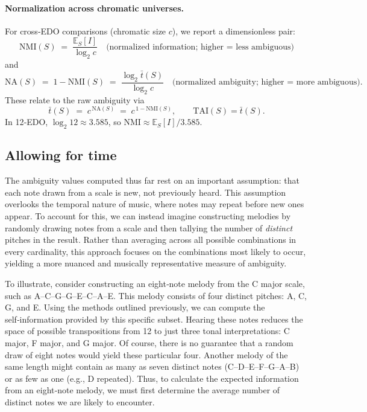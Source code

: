 \documentclass[10pt,twocolumn]{article}
\numberwithin{equation}{section} %
\begin{document}
    

    \paragraph{Normalization across chromatic universes.}
    For cross‑EDO comparisons (chromatic size $c$), we report a dimensionless pair:
    \[
        \mathrm{NMI}(S) \;=\; \frac{\mathbb{E}_S[I]}{\log_2 c} \quad \text{(normalized information; higher = less ambiguous)}
    \]
    and
    \[
        \mathrm{NA}(S) \;=\; 1 - \mathrm{NMI}(S) \;=\; \frac{\log_2 \bar{t}(S)}{\log_2 c} \quad \text{(normalized ambiguity; higher = more ambiguous)}.
    \]
    These relate to the raw ambiguity via
    \[
        \bar{t}(S) \;=\; c^{\,\mathrm{NA}(S)} \;=\; c^{\,1-\mathrm{NMI}(S)}, \qquad \mathrm{TAI}(S)=\bar{t}(S).
    \]
    In 12‑EDO, $\log_2 12 \approx 3.585$, so $\mathrm{NMI}\approx \mathbb{E}_S[I]/3.585$.



    \subsection{Allowing for time}

    The ambiguity values computed thus far rest on an important assumption: that each note drawn from a scale is new, not previously heard.
    This assumption overlooks the temporal nature of music, where notes may repeat before new ones appear.
    To account for this, we can instead imagine constructing melodies by randomly drawing notes from a scale and then tallying the number of \textit{distinct} pitches in the result.
    Rather than averaging across all possible combinations in every cardinality, this approach focuses on the combinations most likely to occur, yielding a more nuanced and musically representative measure of ambiguity.

    To illustrate, consider constructing an eight‑note melody from the C major scale, such as A–C–G–G–E–C–A–E. This melody consists of four distinct pitches: A, C, G, and E.
    Using the methods outlined previously, we can compute the self‑information provided by this specific subset.
    Hearing these notes reduces the space of possible transpositions from 12 to just three tonal interpretations: C major, F major, and G major.
    Of course, there is no guarantee that a random draw of eight notes would yield these particular four.
    Another melody of the same length might contain as many as seven distinct notes (C–D–E–F–G–A–B) or as few as one (e.g., D repeated).
    Thus, to calculate the expected information from an eight‑note melody, we must first determine the average number of distinct notes we are likely to encounter.
\end{document}
